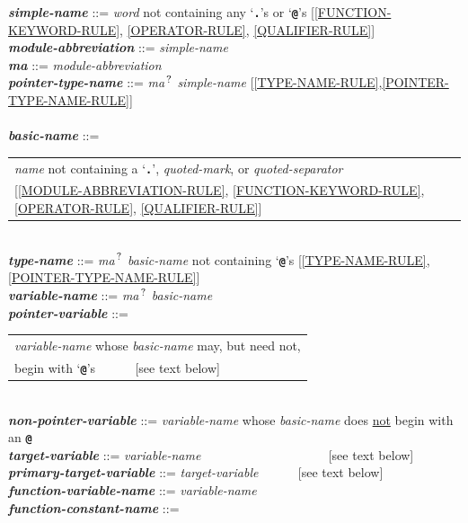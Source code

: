 \documentclass[12pt]{article}
\newcommand{\TT}[1]{{\tt \bfseries #1}}
\newcommand{\QMARK}{{$^{\,\mbox{\footnotesize ?}}$}}
\newcommand{\MA}{{\em ma}\QMARK}
\newcommand{\emkey}[1]{{\em \bfseries #1}}
\newenvironment{indpar}[1][0.3in]%
	{\begin{list}{}%
		     {\setlength{\itemsep}{0in}%
		      \setlength{\topsep}{0in}%
		      \setlength{\parsep}{1ex}%
		      \setlength{\labelwidth}{#1}%
		      \setlength{\leftmargin}{#1}%
		      \addtolength{\leftmargin}{\labelsep}}%
	 \item}%
	{\end{list}}
\begin{document}
\begin{indpar}
\emkey{simple-name} ::= {\em word} not containing any `\TT{.}'s or `\TT{@}'s
    [\ref{FUNCTION-KEYWORD-RULE},
     \ref{OPERATOR-RULE},
     \ref{QUALIFIER-RULE}] \\
\emkey{module-abbreviation}\label{MODULE-ABBREVIATION} ::= {\em simple-name} \\
\emkey{ma} ::= {\em module-abbreviation} \\
\emkey{pointer-type-name}\label{POINTER-TYPE-NAME} ::=
    \MA{} {\em simple-name}
    [\ref{TYPE-NAME-RULE},\ref{POINTER-TYPE-NAME-RULE}] \\
\\[1ex]
\emkey{basic-name}\label{BASIC-NAME} ::=
	\begin{tabular}[t]{@{}l}
	{\em name} not containing a `\TT{.}', {\em quoted-mark}, or
	    {\em quoted-separator} \\{}
	[\ref{MODULE-ABBREVIATION-RULE},
	 \ref{FUNCTION-KEYWORD-RULE},
	 \ref{OPERATOR-RULE},
	 \ref{QUALIFIER-RULE}] \\
	\end{tabular} \\
\emkey{type-name}\label{TYPE-NAME} ::=
    \MA{} {\em basic-name} not containing `\TT{@}'s
	[\ref{TYPE-NAME-RULE},\ref{POINTER-TYPE-NAME-RULE}] \\
\emkey{variable-name}\label{VARIABLE-NAME} ::=
    \MA{} {\em basic-name} \\
\emkey{pointer-variable}\label{POINTER-VARIABLE} ::=
    \begin{tabular}[t]{@{}l@{}}
    {\em variable-name} whose {\em basic-name} may, but need not, \\
    begin with `\TT{@}'s  ~~~~~ [see text below] \\
    \end{tabular} \\
\emkey{non-pointer-variable}\label{NON-POINTER-VARIABLE} ::=
    {\em variable-name} whose {\em basic-name} does \underline{not}
    begin with an \TT{@} \\
\emkey{target-variable}\label{TARGET-VARIABLE} ::=
    {\em variable-name} ~~~~~~~~~~~~~~~~~~~ [see text below] \\
\emkey{primary-target-variable}\label{PRIMARY-TARGET-VARIABLE} ::=
    {\em target-variable} ~~~~~ [see text below] \\
\emkey{function-variable-name}\label{FUNCTION-VARIABLE-NAME} ::=
    {\em variable-name} \\
\emkey{function-constant-name}\label{FUNCTION-CONSTANT-NAME} ::=

\end{indpar}
\end{document}

